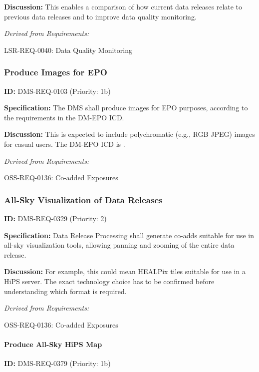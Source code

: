 \documentclass[SE,toc,lsstdraft]{lsstdoc}
\begin{document}
\textbf{Discussion: }This enables a comparison of how current data releases relate to previous data releases and to improve data quality monitoring.

\emph{Derived from Requirements:}

LSR-REQ-0040:
Data Quality Monitoring \newline

\subsubsection{Produce Images for EPO}

\label{DMS-REQ-0103}
\textbf{ID:} DMS-REQ-0103 (Priority: 1b)

\textbf{Specification:} The DMS shall produce images for EPO purposes, according to the requirements in the DM-EPO ICD.

    \textbf{Discussion: }This is expected to include polychromatic (e.g., RGB JPEG) images for casual users. The DM-EPO ICD is .

\emph{Derived from Requirements:}

OSS-REQ-0136:
Co-added Exposures \newline

\subsubsection{All-Sky Visualization of Data Releases}

\label{DMS-REQ-0329}
\textbf{ID:} DMS-REQ-0329 (Priority: 2)

\textbf{Specification:} Data Release Processing shall generate co-adds suitable for use in all-sky visualization tools, allowing panning and zooming of the entire data release.

\textbf{Discussion:} For example, this could mean HEALPix tiles suitable for use in a HiPS server. The exact technology choice has to be confirmed before understanding which format is required.

\emph{Derived from Requirements:}

OSS-REQ-0136:
Co-added Exposures \newline

\paragraph{Produce All-Sky HiPS Map}\hfill  %

\label{DMS-REQ-0379}
\textbf{ID:} DMS-REQ-0379 (Priority: 1b)
\end{document}
